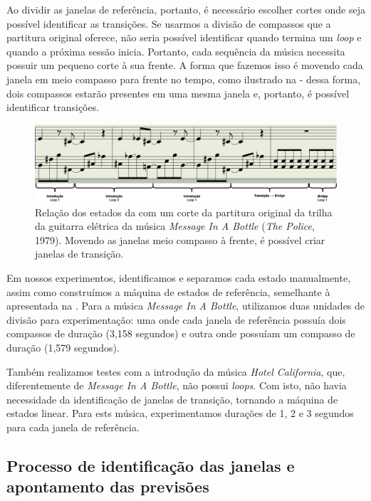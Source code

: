 Ao dividir as janelas de referência, portanto, é necessário escolher cortes onde seja possível identificar as transições. Se usarmos a divisão de compassos que a partitura original oferece, não seria possível identificar quando termina um \textit{loop} e quando a próxima sessão inicia. Portanto, cada sequência da música necessita possuir um pequeno corte à sua frente. A forma que fazemos isso é movendo cada janela em meio compasso para frente no tempo, como ilustrado na  - dessa forma, dois compassos estarão presentes em uma mesma janela e, portanto, é possível identificar transições.

\begin{figure}[htbp]
    \centering
    \includegraphics[width=1\textwidth]{images/dtw-window division.png}
    \caption{Relação dos estados da  com um corte da partitura original da trilha da guitarra elétrica da música \textit{Message In A Bottle} (\textit{The Police}, 1979). Movendo as janelas meio compasso à frente, é possível criar janelas de transição.}
    \label{fig:miab_windowed_sheet_music}
\end{figure}

Em nossos experimentos, identificamos e separamos cada estado manualmente, assim como construímos a máquina de estados de referência, semelhante à apresentada na . Para a música \textit{Message In A Bottle}, utilizamos duas unidades de divisão para experimentação: uma onde cada janela de referência possuía dois compassos de duração (3,158 segundos) e outra onde possuíam um compasso de duração (1,579 segundos).

Também realizamos testes com a introdução da música \textit{Hotel California}, que, diferentemente de \textit{Message In A Bottle}, não possui \textit{loops}. Com isto, não havia necessidade da identificação de janelas de transição, tornando a máquina de estados linear. Para ests música, experimentamos durações de 1, 2 e 3 segundos para cada janela de referência.

\subsection{Processo de identificação das janelas e apontamento das previsões}

